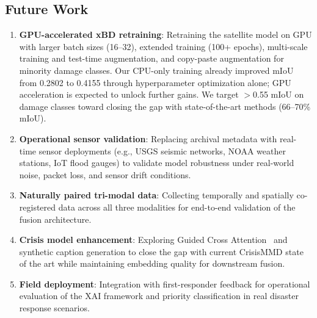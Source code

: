 \documentclass[journal]{IEEEtran}
\begin{document}
\subsection{Future Work}
\label{sec:future}

\begin{enumerate}
    \item \textbf{GPU-accelerated xBD retraining}: Retraining the satellite model on GPU with larger batch sizes (16--32), extended training (100+ epochs), multi-scale training and test-time augmentation, and copy-paste augmentation for minority damage classes. Our CPU-only training already improved mIoU from 0.2802 to 0.4155 through hyperparameter optimization alone; GPU acceleration is expected to unlock further gains. We target $>$0.55 mIoU on damage classes toward closing the gap with state-of-the-art methods (66--70\% mIoU).
    \item \textbf{Operational sensor validation}: Replacing archival metadata with real-time sensor deployments (e.g., USGS seismic networks, NOAA weather stations, IoT flood gauges) to validate model robustness under real-world noise, packet loss, and sensor drift conditions.
    \item \textbf{Naturally paired tri-modal data}: Collecting temporally and spatially co-registered data across all three modalities for end-to-end validation of the fusion architecture.
    \item \textbf{Crisis model enhancement}: Exploring Guided Cross Attention~\cite{mouzannar2025guidedcross} and synthetic caption generation to close the gap with current CrisisMMD state of the art while maintaining embedding quality for downstream fusion.
    \item \textbf{Field deployment}: Integration with first-responder feedback for operational evaluation of the XAI framework and priority classification in real disaster response scenarios.
\end{enumerate}
\end{document}
